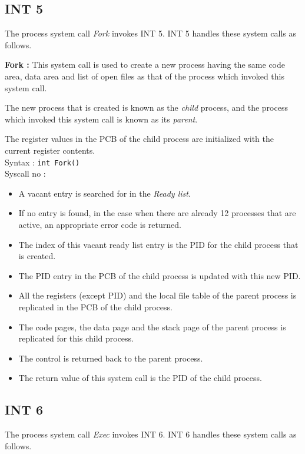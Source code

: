\documentclass[11pt]{report}
\newcommand\counter[1]{\arabic{#1} \stepcounter{#1}}
\newcounter{syscall}
\begin{document}
\subsection{INT 5}
The process system call \textit{Fork} invokes INT 5. INT 5 handles these system calls as follows.

\textbf{Fork :}  This system call is used to create a new process having the same code area, data area and list of open files as that of the process which invoked this system call.

The new process that is created is known as the \emph{child} process, and the process which invoked this system call is known as its \emph{parent}.

The register values in the PCB of the child process are initialized with the current register contents.\\
Syntax : \texttt{int Fork()} \\
Syscall no : \counter{syscall}
\begin{itemize}
	\item A vacant entry is searched for in the \emph{Ready list}.
	\item If no entry is found, in the case when there are already 12 processes that are active, an appropriate error code is returned.
	\item The index of this vacant ready list entry is the PID for the child process that is created.
	\item The PID entry in the PCB of the child process is updated with this new PID.
	\item All the registers (except PID) and the local file table of the parent process is replicated in the PCB of the child process.
	\item The code pages, the data page and the stack page of the parent process is replicated for this child process.
	\item The control is returned back to the parent process.
	\item The return value of this system call is the PID of the child process.
\end{itemize}

\subsection{INT 6}
The process system call \textit{Exec} invokes INT 6. INT 6 handles these system calls as follows.
\end{document}
